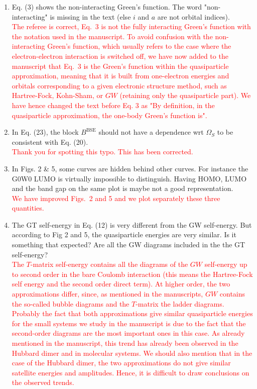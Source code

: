 \documentclass[10pt]{letter}
\newcommand{\alert}[1]{\textcolor{red}{#1}}
\begin{document}
\begin{letter}
\begin{enumerate}
\item 
{Eq. (3) shows the non-interacting Green's function. 
The word "non-interacting" is missing in the text (else $i$ and $a$ are not orbital indices). }
\\
\alert{The referee is correct, Eq.~3 is not the fully interacting Green's function with the notation used in the manuscript. 
To avoid confusion with the non-interacting Green's function, which usually refers to the case where the electron-electron interaction is switched off, we have now added to the manuscript that Eq.~3 is the Green's function within the quasiparticle approximation, meaning that it is built from one-electron energies and orbitals corresponding to a given electronic structure method, such as Hartree-Fock, Kohn-Sham, or $GW$ (retaining only the quasiparticle part). We have hence changed the text before Eq. 3 as "By definition, in the quasiparticle approximation, the one-body Green's function is".
}

\item 
{In Eq. (23), the block $B^\text{BSE}$ should not have a dependence wrt $\Omega_S$ to be consistent with Eq. (20).}
\\
\alert{
Thank you for spotting this typo. 
This has been corrected.
}

\item 
{In Figs. 2 \& 5, some curves are hidden behind other curves. For instance the G0W0 LUMO is virtually impossible to distinguish. 
Having HOMO, LUMO and the band gap on the same plot is maybe not a good representation.}
\\
\alert{
We have improved Figs.~2 and 5 and we plot separately these three quantities.
}

\item 
{The GT self-energy in Eq. (12) is very different from the GW self-energy. 
But according to Fig 2 and 5, the quasiparticle energies are very similar. 
Is it something that expected? 
Are all the GW diagrams included in the the GT self-energy?}
\\
\alert{The $T$-matrix self-energy contains all the diagrams of the $GW$ self-energy up to second order in the bare Coulomb interaction (this means the Hartree-Fock self energy and the second order direct term). 
At higher order, the two approximations differ, since, as mentioned in the manuscripts, $GW$ contains the so-called bubble diagrams and the $T$-matrix the ladder diagrams. 
Probably the fact that both approximations give similar quasiparticle energies for the small systems we study in the manuscript is due to the fact that the second-order diagrams are the most important ones in this case. 
As already mentioned in the manuscript, this trend has already been observed in the Hubbard dimer and in molecular systems. 
We should also mention that in the case of the Hubbard dimer, the two approximations do not give similar satellite energies and amplitudes. 
Hence, it is difficult to draw conclusions on the observed trends.}


\end{enumerate}
\end{letter}
\end{document}
